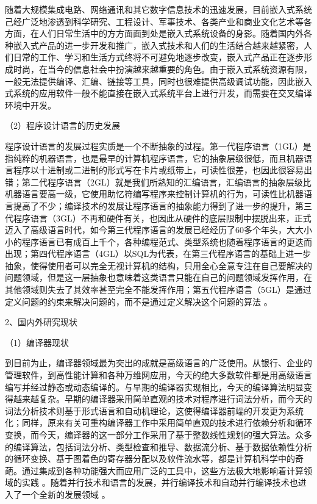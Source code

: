 \documentclass{csustThesis}
\begin{document}
\begin{ubox}[breakable,]
随着大规模集成电路、网络通讯和其它数字信息技术的迅速发展，目前嵌入式系统己经广泛地渗透到科学研究、工程设计、军事技术、各类产业和商业文化艺术等各方面，在人们日常生活中的方方面面到处是嵌入式系统设备的身影。随着国内外各种嵌入式产品的进一步开发和推广，嵌入式技术和人们的生活结合越来越紧密，人们日常的工作、学习和生活方式终将不可避免地逐步改变，嵌入式产品正在逐步形成时尚，在当今的信息社会中扮演越来越重要的角色。由于嵌入式系统资源有限，一般无法提供编译、汇编、链接等工具，同时也很难提供高级调试功能，因此嵌入式系统的应用软件一般不能直接在嵌入式系统平台上进行开发，而需要在交叉编译环境中开发\cite*{xrhk2010_wl50n}。

（2）程序设计语言的历史发展

程序设计语言的发展过程实质是一个不断抽象的过程。第一代程序语言（1GL）是指纯粹的机器语言，也是最早的计算机程序语言，它的抽象层级很低，而且机器语言程序以十进制或二进制的形式写在卡片或纸带上，可读性很差，也因此很容易出错；第二代程序语言（2GL）就是我们所熟知的汇编语言，汇编语言的抽象层级比机器语言要高一级，它使用助忆符编写程序来控制计算机的行为，可读性比机器语言提高了不少；编译技术的发展让程序语言的抽象能力得到了进一步的提升，第三代程序语言（3GL）不再和硬件有关，也因此从硬件的底层限制中摆脱出来，正式迈入了高级语言时代，如今第三代程序语言的发展已经经历了60多个年头，大大小小的程序语言已有成百上千个，各种编程范式、类型系统也随着程序语言的更迭而出现；第四代程序语言（4GL）以SQL为代表，在第三代程序语言的基础上进一步抽象，使得使用者可以完全无视计算机的结构，只用全心全意专注在自己要解决的问题领域，但是这一层抽象也意味着这类语言只能在自己的问题领域发挥作用，在其他领域则失去了其效率甚至完全不能发挥作用；第五代程序语言（5GL）是通过定义问题的约束来解决问题的，而不是通过定义解决这个问题的算法\cite*{cym2017,jeba2020} 。

2、国内外研究现状

（1）编译器现状

到目前为止，编译器领域最为突出的成就是高级语言的广泛使用。从银行、企业的管理软件，到高性能计算和各种万维网应用，今天的绝大多数软件都是用高级语言编写并经过静态或动态编译的。与早期的编译器实现相比，今天的编译算法明显变得越来越复杂。早期的编译器采用简单直观的技术对程序进行词法分析，而今天的词法分析技术则基于形式语言和自动机理论，这使得编译器前端的开发更为系统化；同样，原来有关可重构编译器工作中采用简单直观的技术进行依赖分析和循环变换，而今天，编译器的这一部分工作采用了基于整数线性规划的强大算法。众多的编译算法，包括词法分析、类型检查和推导、数据流分析、基于数据依赖性分析的循环变换、基于图着色的寄存器分配以及软件流水等，都是计算机科学中的奇葩。通过集成到各种功能强大而应用广泛的工具中，这些方法极大地影响着计算领域的实践\cite*{xrhk2010_wl50n} 。随着并行技术和语言的发展，并行编译技术和自动并行编译技术也进入了一个全新的发展领域\cite*{xrhk2010_qtbyyl} 。


\end{ubox}
\end{document}
